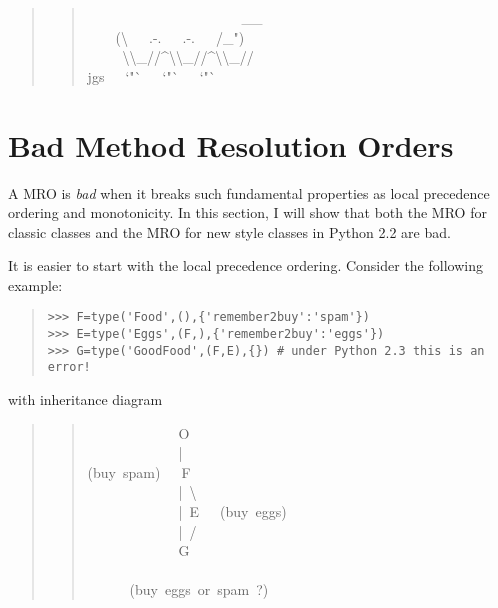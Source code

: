 \documentclass[10pt,a4paper,english]{article}
\begin{document}
\begin{quote}
\begin{quote}{\ttfamily \raggedright \noindent
~~~~~~~~~~~~~~~~~~~~~~{\_}{\_}~\\
~~~~({\textbackslash}~~~.-.~~~.-.~~~/{\_}")~\\
~~~~~{\textbackslash}{\textbackslash}{\_}//{\textasciicircum}{\textbackslash}{\textbackslash}{\_}//{\textasciicircum}{\textbackslash}{\textbackslash}{\_}//~\\
jgs~~~`"`~~~`"`~~~`"`
}\end{quote}
\end{quote}



\hypertarget{bad-method-resolution-orders}{}
\section*{Bad Method Resolution Orders}

A MRO is \emph{bad} when it breaks such fundamental properties as local
precedence ordering and monotonicity.  In this section, I will show
that both the MRO for classic classes and the MRO for new style classes
in Python 2.2 are bad.

It is easier to start with the local precedence ordering.  Consider the
following example:
\begin{quote}
\begin{verbatim}>>> F=type('Food',(),{'remember2buy':'spam'})
>>> E=type('Eggs',(F,),{'remember2buy':'eggs'})
>>> G=type('GoodFood',(F,E),{}) # under Python 2.3 this is an error!\end{verbatim}
\end{quote}

with inheritance diagram
\begin{quote}
\begin{quote}{\ttfamily \raggedright \noindent
~~~~~~~~~~~~~O~\\
~~~~~~~~~~~~~|~\\
(buy~spam)~~~F~\\
~~~~~~~~~~~~~|~{\textbackslash}~\\
~~~~~~~~~~~~~|~E~~~(buy~eggs)~\\
~~~~~~~~~~~~~|~/~\\
~~~~~~~~~~~~~G~\\
~\\
~~~~~~(buy~eggs~or~spam~?)
}\end{quote}
\end{quote}
\end{document}
